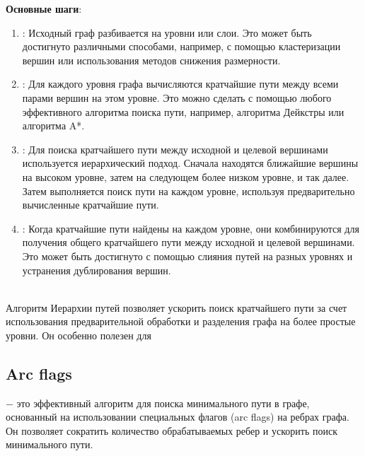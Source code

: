        \textbf{Основные шаги}:
        \begin{enumerate}
            \item {}: Исходный граф разбивается на уровни или слои. Это может быть достигнуто различными способами, например, с помощью кластеризации вершин или использования методов снижения размерности.
            \item {}: Для каждого уровня графа вычисляются кратчайшие пути между всеми парами вершин на этом уровне. Это можно сделать с помощью любого эффективного алгоритма поиска пути, например, алгоритма Дейкстры или алгоритма A*.
            \item {}: Для поиска кратчайшего пути между исходной и целевой вершинами используется иерархический подход. Сначала находятся ближайшие вершины на высоком уровне, затем на следующем более низком уровне, и так далее. Затем выполняется поиск пути на каждом уровне, используя предварительно вычисленные кратчайшие пути.
            \item {}: Когда кратчайшие пути найдены на каждом уровне, они комбинируются для получения общего кратчайшего пути между исходной и целевой вершинами. Это может быть достигнуто с помощью слияния путей на разных уровнях и устранения дублирования вершин.
        \end{enumerate}\\

        Алгоритм Иерархии путей позволяет ускорить поиск кратчайшего пути за счет использования предварительной обработки и разделения графа на более простые уровни. Он особенно полезен для

    
    \subsection{Arc flags}
         $-$ это эффективный алгоритм для поиска минимального пути в графе, основанный на использовании специальных флагов (arc flags) на ребрах графа. Он позволяет сократить количество обрабатываемых ребер и ускорить поиск минимального пути.\\

